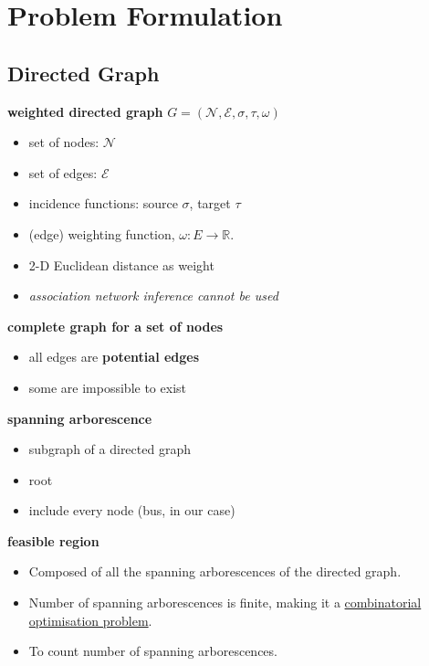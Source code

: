 \documentclass[
]{book}
\providecommand{\tightlist}{%
  \setlength{\itemsep}{0pt}\setlength{\parskip}{0pt}}
\begin{document}
\hypertarget{problem-formulation}{%
\chapter{Problem Formulation}\label{problem-formulation}}

\hypertarget{directed-graph}{%
\section{Directed Graph}\label{directed-graph}}

\textbf{weighted directed graph}
\(G = (\mathcal{N}, \mathcal{E}, \sigma, \tau, \omega)\)

\begin{itemize}
\tightlist
\item
  set of nodes: \(\mathcal{N}\)
\item
  set of edges: \(\mathcal{E}\)
\item
  incidence functions: source \(\sigma\), target \(\tau\)
\item
  (edge) weighting function, \(\omega: E \rightarrow \mathbb{R}\).
\item
  2-D Euclidean distance as weight
\item
  \emph{association network inference cannot be used}
\end{itemize}

\textbf{complete graph for a set of nodes}

\begin{itemize}
\tightlist
\item
  all edges are \textbf{potential edges}
\item
  some are impossible to exist
\end{itemize}

\textbf{spanning arborescence}

\begin{itemize}
\tightlist
\item
  subgraph of a directed graph
\item
  root
\item
  include every node (bus, in our case)
\end{itemize}

\textbf{feasible region}

\begin{itemize}
\tightlist
\item
  Composed of all the spanning arborescences of the directed graph.
\item
  Number of spanning arborescences is finite, making it a \protect\hyperlink{combinatorial}{combinatorial
  optimisation problem}.
\item
  To count number of spanning arborescences.
\end{itemize}
\end{document}
